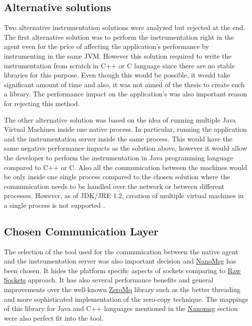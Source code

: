 \subsection{Alternative solutions}
Two alternative instrumentation solutions were analyzed but rejected at the end. The first alternative solution was to perform the instrumentation right in the agent even for the price of affecting the application's performance by instrumenting in the same JVM. However this solution required to write the instrumentation from scratch in C++ or C language since there are no stable libraries for this purpose. Even though this would be possible, it would take significant amount of time and also, it was not aimed of the thesis to create such a library. The performance impact on the application's was also important reason for rejecting this method.

The other alternative solution was based on the idea of running multiple Java Virtual Machines inside one native process. In particular, running the application and the instrumentation server inside the same process. This would have the same  negative performance impacts as the solution above, however it would allow the developer to perform the instrumentation in Java programming language compared to C++ or C. Also all the communication between the machines would be only inside one single process compared to the chosen solution where the communication needs to be handled over the network or between different processes. However, as of JDK/JRE 1.2, creation of multiple virtual machines in a single process is not supported \cite{MoreJVMOnceProccess}.
							
\subsection{Chosen Communication Layer}
The selection of the tool used for the communication between the native agent and the instrumentation server was also important decision and \hyperref[nanomsg]{NanoMsg} has been chosen. It hides the platform specific aspects of sockets comparing to \hyperref[raw_sockets]{Raw Sockets} approach. It has also several performance benefits and general improvements over the well-known \hyperref[zeromq]{ZeroMq} library such as the better threading and more sophisticated implementation of the zero-copy technique. The mappings of this library for Java and C++ languages mentioned in the \hyperref[nanomsg]{Nanomsg} section were also perfect fit into the tool.
		

